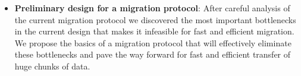 \begin{itemize}
\item{\textbf{Preliminary design for a migration protocol}}: After careful analysis of the current migration protocol
 we discovered the most important bottlenecks in the current design that makes it infeasible for fast and efficient migration.
 We propose the basics of a migration protocol that will effectively eliminate these bottlenecks and pave the way
 forward for fast and efficient transfer of huge chunks of data.
\end{itemize}

